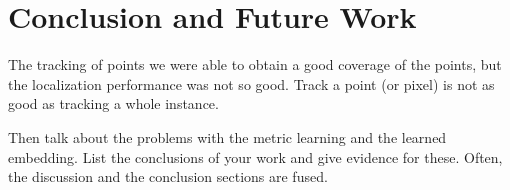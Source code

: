 
\chapter{Conclusion and Future Work}
\label{cha:conclusionsfuturework}

The tracking of points we were able to obtain a good coverage of the points, but the localization performance was not so good. Track a point (or pixel) is not as good as tracking a whole instance.

Then talk about the problems with the metric learning and the learned embedding.
List the conclusions of your work and give evidence for these. Often, the discussion and the conclusion sections are fused. 

